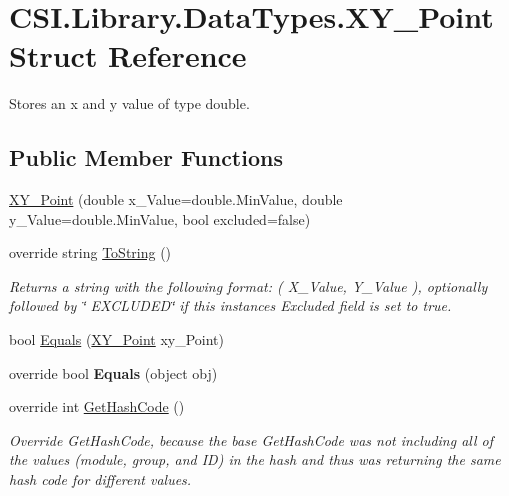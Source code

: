 \hypertarget{struct_c_s_i_1_1_library_1_1_data_types_1_1_x_y___point}{}\section{C\+S\+I.\+Library.\+Data\+Types.\+X\+Y\+\_\+\+Point Struct Reference}
\label{struct_c_s_i_1_1_library_1_1_data_types_1_1_x_y___point}


Stores an x and y value of type double.  


\subsection*{Public Member Functions}
\begin{DoxyCompactItemize}
\item 
\mbox{\hyperlink{struct_c_s_i_1_1_library_1_1_data_types_1_1_x_y___point_a6dfa8a9bec686c68b99eb0cfd48edf81}{X\+Y\+\_\+\+Point}} (double x\+\_\+\+Value=double.\+Min\+Value, double y\+\_\+\+Value=double.\+Min\+Value, bool excluded=false)
\item 
override string \mbox{\hyperlink{struct_c_s_i_1_1_library_1_1_data_types_1_1_x_y___point_a01859cb5642dd98cb6bdc44b71d929ce}{To\+String}} ()
\begin{DoxyCompactList}\small\item\em Returns a string with the following format\+: ( X\+\_\+\+Value, Y\+\_\+\+Value ), optionally followed by \char`\"{} E\+X\+C\+L\+U\+D\+E\+D\char`\"{} if this instance\textquotesingle{}s Excluded field is set to true. \end{DoxyCompactList}\item 
bool \mbox{\hyperlink{struct_c_s_i_1_1_library_1_1_data_types_1_1_x_y___point_ace282e3b909ff95bb8376516f05fff81}{Equals}} (\mbox{\hyperlink{struct_c_s_i_1_1_library_1_1_data_types_1_1_x_y___point}{X\+Y\+\_\+\+Point}} xy\+\_\+\+Point)
\item 
\mbox{\label{struct_c_s_i_1_1_library_1_1_data_types_1_1_x_y___point_a57e298b54de7c3e4592726d5c6e9b92f}} 
override bool {\bfseries Equals} (object obj)
\item 
override int \mbox{\hyperlink{struct_c_s_i_1_1_library_1_1_data_types_1_1_x_y___point_a4045c0fed4429382dcec3835b3ff626c}{Get\+Hash\+Code}} ()
\begin{DoxyCompactList}\small\item\em Override Get\+Hash\+Code, because the base Get\+Hash\+Code was not including all of the values (module, group, and ID) in the hash and thus was returning the same hash code for different values. \end{DoxyCompactList}\end{DoxyCompactItemize}
